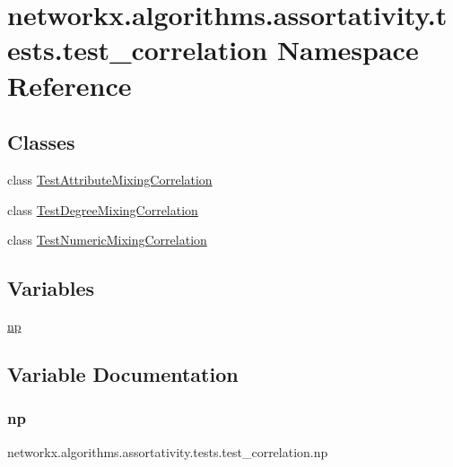 \hypertarget{namespacenetworkx_1_1algorithms_1_1assortativity_1_1tests_1_1test__correlation}{}\section{networkx.\+algorithms.\+assortativity.\+tests.\+test\+\_\+correlation Namespace Reference}
\label{namespacenetworkx_1_1algorithms_1_1assortativity_1_1tests_1_1test__correlation}
\subsection*{Classes}
\begin{DoxyCompactItemize}
\item 
class \hyperlink{classnetworkx_1_1algorithms_1_1assortativity_1_1tests_1_1test__correlation_1_1TestAttributeMixingCorrelation}{Test\+Attribute\+Mixing\+Correlation}
\item 
class \hyperlink{classnetworkx_1_1algorithms_1_1assortativity_1_1tests_1_1test__correlation_1_1TestDegreeMixingCorrelation}{Test\+Degree\+Mixing\+Correlation}
\item 
class \hyperlink{classnetworkx_1_1algorithms_1_1assortativity_1_1tests_1_1test__correlation_1_1TestNumericMixingCorrelation}{Test\+Numeric\+Mixing\+Correlation}
\end{DoxyCompactItemize}
\subsection*{Variables}
\begin{DoxyCompactItemize}
\item 
\hyperlink{namespacenetworkx_1_1algorithms_1_1assortativity_1_1tests_1_1test__correlation_a325ca2c053f471db7f278010303fc941}{np}
\end{DoxyCompactItemize}


\subsection{Variable Documentation}
\mbox{\label{namespacenetworkx_1_1algorithms_1_1assortativity_1_1tests_1_1test__correlation_a325ca2c053f471db7f278010303fc941}} 
\subsubsection{\texorpdfstring{np}{np}}
{\footnotesize\ttfamily networkx.\+algorithms.\+assortativity.\+tests.\+test\+\_\+correlation.\+np}

